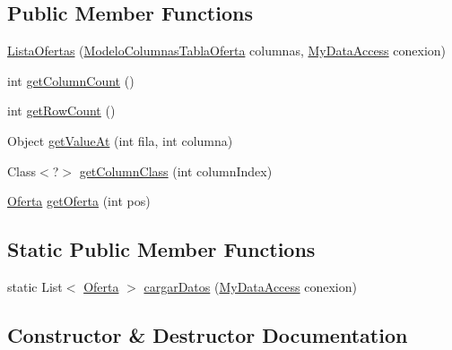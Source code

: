 \subsection*{Public Member Functions}
\begin{DoxyCompactItemize}
\item 
\mbox{\hyperlink{classoferta_1_1_lista_ofertas_a2af761366b995c4ddf7cb6b1175de314}{Lista\+Ofertas}} (\mbox{\hyperlink{classoferta_1_1_modelo_columnas_tabla_oferta}{Modelo\+Columnas\+Tabla\+Oferta}} columnas, \mbox{\hyperlink{classconexion_s_q_l_1_1_my_data_access}{My\+Data\+Access}} conexion)
\item 
int \mbox{\hyperlink{classoferta_1_1_lista_ofertas_a1134f680b1eb3a296d3f0db1f5f6c708}{get\+Column\+Count}} ()
\item 
int \mbox{\hyperlink{classoferta_1_1_lista_ofertas_af98f5114e3dc3f259ec55a2ab865c1af}{get\+Row\+Count}} ()
\item 
Object \mbox{\hyperlink{classoferta_1_1_lista_ofertas_a31d3834ba593c933f612572a942fc601}{get\+Value\+At}} (int fila, int columna)
\item 
Class$<$?$>$ \mbox{\hyperlink{classoferta_1_1_lista_ofertas_a86faae91c71fe103470f039a09213048}{get\+Column\+Class}} (int column\+Index)
\item 
\mbox{\hyperlink{classoferta_1_1_oferta}{Oferta}} \mbox{\hyperlink{classoferta_1_1_lista_ofertas_aff266896ffa3bb5682ef4ecf1d514f2e}{get\+Oferta}} (int pos)
\end{DoxyCompactItemize}
\subsection*{Static Public Member Functions}
\begin{DoxyCompactItemize}
\item 
static List$<$ \mbox{\hyperlink{classoferta_1_1_oferta}{Oferta}} $>$ \mbox{\hyperlink{classoferta_1_1_lista_ofertas_a7ad03e98699edb0253f41109273e350e}{cargar\+Datos}} (\mbox{\hyperlink{classconexion_s_q_l_1_1_my_data_access}{My\+Data\+Access}} conexion)
\end{DoxyCompactItemize}


\subsection{Constructor \& Destructor Documentation}
\mbox{\label{classoferta_1_1_lista_ofertas_a2af761366b995c4ddf7cb6b1175de314}} 
